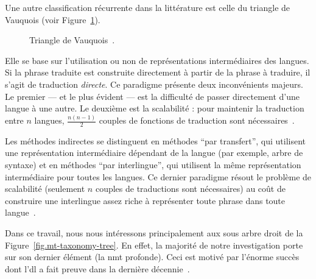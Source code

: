Une autre classification récurrente dans la littérature 
est celle du triangle de Vauquois (voir Figure~\ref{fig.vauquois-triangle}).
\begin{figure}[hbt]
    \begin{center}
        
    \end{center}
    \caption[Triangle de Vauquois.]
    {Triangle de Vauquois~\cite{hybrid-mt}.}
    \label{fig.vauquois-triangle}
\end{figure}
Elle se base sur l'utilisation ou non de représentations intermédiaires des langues.
Si la phrase traduite est construite directement à partir de la phrase à traduire,
il s'agit de traduction \emph{directe}.
Ce paradigme présente deux inconvénients majeurs.
Le premier --- et le plus évident --- est la difficulté de passer directement d'une langue à une autre.
Le deuxième est la scalabilité : pour maintenir la traduction entre \(n\) langues,
\(\frac{n(n - 1)}{2}\) couples de fonctions de traduction sont nécessaires~\cite{routledge}.

Les méthodes indirectes se distinguent en méthodes ``par transfert'', 
qui utilisent une représentation intermédiaire dépendant de la langue (par exemple, arbre de syntaxe)
et en méthodes ``par interlingue'',
qui utilisent la même représentation intermédiaire pour toutes les langues.
Ce dernier paradigme résout le problème de scalabilité 
(seulement \(n\) couples de traductions sont nécessaires)
au coût de construire une interlingue assez riche à représenter toute phrase dans toute langue~\cite{routledge}.

Dans ce travail, 
nous nous intéressons principalement aux sous arbre droit de la Figure~\ref{fig.mt-taxonomy-tree}.
En effet, la majorité de notre investigation porte sur son dernier élément (la \gls{nmt} profonde).
Ceci est motivé par l'énorme succès 
dont l'\gls{dl} a fait preuve dans la dernière décennie~\cite{Raschka_Mirjalili_2017}.
